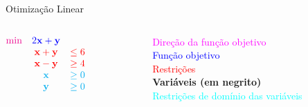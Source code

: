 \documentclass[compress]{beamer}
\begin{document}

\begin{frame}{Otimização Linear}

\begin{columns}[T]
    \begin{column}{.45\textwidth}
        \vspace{1.8cm}
        $\begin{matrix}
        \textcolor{magenta}{\min} & \textcolor{blue}{2\textbf{x} + \textbf{y}}\\ 
             & \textcolor{red}{\textbf{x} + \textbf{y}} & \textcolor{red}{\leq 6} \\ 
             & \textcolor{red}{\textbf{x} - \textbf{y}} & \textcolor{red}{\geq 4} \\ 
             & \textcolor{cyan}{\textbf{x}} & \textcolor{cyan}{\geq 0}\\ 
             & \textcolor{cyan}{\textbf{y}} & \textcolor{cyan}{\geq 0}
        \end{matrix}    
        $
    \end{column}
    \begin{column}{.43\textwidth}
        \vspace{1.8cm}
        \textcolor{magenta}{Direção da função objetivo} \\
        \textcolor{blue}{Função objetivo} \\
        \textcolor{red}{Restrições} \\
        \textbf{Variáveis (em negrito)} \\
        \textcolor{cyan}{Restrições de domínio das variáveis}
    \end{column}
\end{columns}

\end{frame}

\end{document}
